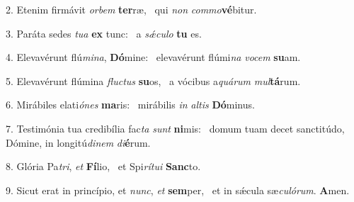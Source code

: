 2. Etenim firmávit \textit{or}\textit{bem} \textbf{ter}ræ, \ast\  qui \textit{non} \textit{com}\textit{mo}\textbf{vé}bitur.\

3. Paráta sedes \textit{tu}\textit{a} \textbf{ex} tunc: \ast\  a \textit{sǽ}\textit{cu}\textit{lo} \textbf{tu} es.\

4. Elevavérunt flú\textit{mi}\textit{na}, \textbf{Dó}mine: \ast\  elevavérunt flúmi\textit{na} \textit{vo}\textit{cem} \textbf{su}am.\

5. Elevavérunt flúmina \textit{fluc}\textit{tus} \textbf{su}os, \ast\  a vócibus a\textit{quá}\textit{rum} \textit{mul}\textbf{tá}rum.\

6. Mirábiles elati\textit{ó}\textit{nes} \textbf{ma}ris: \ast\  mirábilis \textit{in} \textit{al}\textit{tis} \textbf{Dó}minus.\

7. Testimónia tua credibília fac\textit{ta} \textit{sunt} \textbf{ni}mis: \ast\  domum tuam decet sanctitúdo, Dómine, in longitú\textit{di}\textit{nem} \textit{di}\textbf{é}rum.\

8. Glória Pa\textit{tri}, \textit{et} \textbf{Fí}lio, \ast\  et Spi\textit{rí}\textit{tu}\textit{i} \textbf{Sanc}to.\

9. Sicut erat in princípio, et \textit{nunc}, \textit{et} \textbf{sem}per, \ast\  et in sǽcula sæ\textit{cu}\textit{ló}\textit{rum}. \textbf{A}men.\

